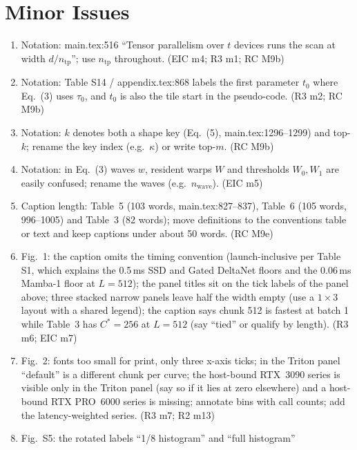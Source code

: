 \documentclass[11pt]{article}
\begin{document}
\section*{Minor Issues}
\begin{enumerate}[label=N\arabic*.]
  \item Notation: main.tex:516 ``Tensor parallelism over $t$ devices runs the
        scan at width $d/n_{\mathrm{tp}}$''; use $n_{\mathrm{tp}}$ throughout.
        (EIC m4; R3 m1; RC M9b)
  \item Notation: Table S14 / appendix.tex:868 labels the first parameter
        $t_0$ where Eq.~(3) uses $\tau_0$, and $t_0$ is also the tile start in
        the pseudo-code. (R3 m2; RC M9b)
  \item Notation: $k$ denotes both a shape key (Eq.~(5), main.tex:1296--1299)
        and top-$k$; rename the key index (e.g.\ $\kappa$) or write top-$m$.
        (RC M9b)
  \item Notation: in Eq.~(3) waves $w$, resident warps $W$ and thresholds
        $W_0, W_1$ are easily confused; rename the waves (e.g.\
        $n_{\mathrm{wave}}$). (EIC m5)
  \item Caption length: Table~5 (103 words, main.tex:827--837), Table~6 (105
        words, 996--1005) and Table~3 (82 words); move definitions to the
        conventions table or text and keep captions under about 50 words.
        (RC M9e)
  \item Fig.~1: the caption omits the timing convention (launch-inclusive per
        Table S1, which explains the 0.5\,ms SSD and Gated DeltaNet floors and
        the 0.06\,ms Mamba-1 floor at $L=512$); the panel titles sit on the
        tick labels of the panel above; three stacked narrow panels leave half
        the width empty (use a $1\times3$ layout with a shared legend); the
        caption says chunk 512 is fastest at batch 1 while Table~3 has
        $C^*=256$ at $L=512$ (say ``tied'' or qualify by length). (R3 m6; EIC
        m7)
  \item Fig.~2: fonts too small for print, only three x-axis ticks; in the
        Triton panel ``default'' is a different chunk per curve; the host-bound
        RTX~3090 series is visible only in the Triton panel (say so if it lies
        at zero elsewhere) and a host-bound RTX PRO~6000 series is missing;
        annotate bins with call counts; add the latency-weighted series.
        (R3 m7; R2 m13)
  \item Fig.~S5: the rotated labels ``1/8 histogram'' and ``full histogram''

\end{enumerate}
\end{document}
